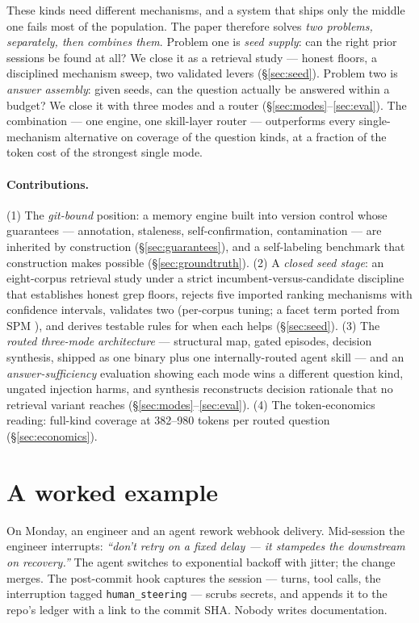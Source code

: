 \documentclass[twocolumn,10pt]{article}
\newcommand{\code}[1]{\texttt{#1}}
\begin{document}
These kinds need different mechanisms, and a system that ships only the middle one fails most of the population. The paper therefore solves \emph{two problems, separately, then combines them}. Problem one is \emph{seed supply}: can the right prior sessions be found at all? We close it as a retrieval study --- honest floors, a disciplined mechanism sweep, two validated levers (\S\ref{sec:seed}). Problem two is \emph{answer assembly}: given seeds, can the question actually be answered within a budget? We close it with three modes and a router (\S\ref{sec:modes}--\ref{sec:eval}). The combination --- one engine, one skill-layer router --- outperforms every single-mechanism alternative on coverage of the question kinds, at a fraction of the token cost of the strongest single mode.

\paragraph{Contributions.}
(1) The \emph{git-bound} position: a memory engine built into version control whose guarantees --- annotation, staleness, self-confirmation, contamination --- are inherited by construction (\S\ref{sec:guarantees}), and a self-labeling benchmark that construction makes possible (\S\ref{sec:groundtruth}).
(2) A \emph{closed seed stage}: an eight-corpus retrieval study under a strict incumbent-versus-candidate discipline \citep{rho2026} that establishes honest grep floors, rejects five imported ranking mechanisms with confidence intervals, validates two (per-corpus tuning; a facet term ported from SPM \citep{spm2026}), and derives testable rules for when each helps (\S\ref{sec:seed}).
(3) The \emph{routed three-mode architecture} --- structural map, gated episodes, decision synthesis, shipped as one binary plus one internally-routed agent skill --- and an \emph{answer-sufficiency} evaluation showing each mode wins a different question kind, ungated injection harms, and synthesis reconstructs decision rationale that no retrieval variant reaches (\S\ref{sec:modes}--\ref{sec:eval}).
(4) The token-economics reading: full-kind coverage at 382--980 tokens per routed question (\S\ref{sec:economics}).

\section{A worked example}\label{sec:example}

On Monday, an engineer and an agent rework webhook delivery. Mid-session the engineer interrupts: \emph{``don't retry on a fixed delay --- it stampedes the downstream on recovery.''} The agent switches to exponential backoff with jitter; the change merges. The post-commit hook captures the session --- turns, tool calls, the interruption tagged \code{human\_steering} --- scrubs secrets, and appends it to the repo's ledger with a link to the commit SHA. Nobody writes documentation.
\end{document}
